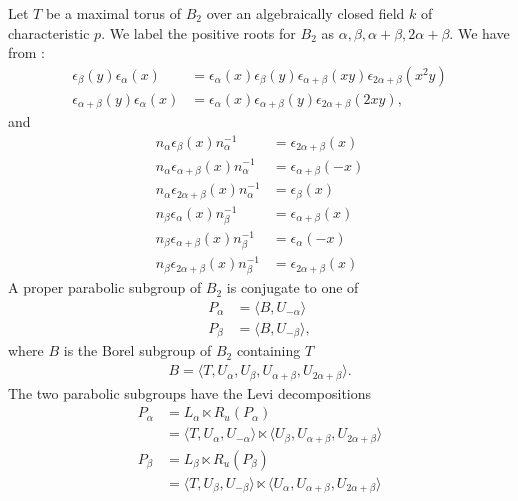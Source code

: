 Let $T$ be a maximal torus of $B_2$ over an algebraically closed field $k$ of characteristic $p$. We label the positive roots for $B_2$ as $\alpha, \beta, \alpha + \beta, 2\alpha + \beta$. We have from \cite[\S 33.4]{humphreys1975linear}:
\begin{align*}
\epsilon_\beta (y) \epsilon_\alpha (x) &= \epsilon_\alpha (x) \epsilon_\beta (y) \epsilon_{\alpha + \beta} (xy) \epsilon_{2\alpha+\beta} (x^2y) \\
\epsilon_{\alpha + \beta} (y) \epsilon_\alpha (x) &= \epsilon_\alpha (x) \epsilon_{\alpha + \beta} (y) \epsilon_{2\alpha + \beta} (2xy),
\end{align*}
and 
\begin{align*}
n_\alpha \epsilon_\beta(x) n_\alpha^{-1} &= \epsilon_{2\alpha+\beta}(x)\\
n_\alpha \epsilon_{\alpha+\beta}(x) n_\alpha^{-1} &= \epsilon_{\alpha+\beta}(-x)\\
n_\alpha \epsilon_{2\alpha+\beta}(x) n_\alpha^{-1} &= \epsilon_{\beta}(x)\\
n_\beta \epsilon_\alpha(x) n_\beta^{-1} &= \epsilon_{\alpha+\beta}(x)\\
n_\beta \epsilon_{\alpha+\beta}(x) n_\beta^{-1} &= \epsilon_{\alpha}(-x)\\
n_\beta \epsilon_{2\alpha+\beta}(x) n_\beta^{-1} &= \epsilon_{2\alpha+\beta}(x)
\end{align*}
A proper parabolic subgroup of $B_2$ is conjugate to one of
\begin{align*}
P_\alpha &= \langle B, U_{-\alpha} \rangle\\
P_\beta &= \langle B, U_{-\beta} \rangle,
\end{align*}
where $B$ is the Borel subgroup of $B_2$ containing $T$
\begin{align*}
B=\langle T, U_\alpha, U_\beta, U_{\alpha + \beta}, U_{2\alpha+\beta}\rangle.
\end{align*}
The two parabolic subgroups have the Levi decompositions
\begin{align*}
P_\alpha &= L_\alpha \ltimes R_u(P_\alpha) \\
&= \langle T, U_\alpha, U_{-\alpha} \rangle \ltimes \langle U_\beta, U_{\alpha + \beta}, U_{2\alpha + \beta} \rangle \\
P_\beta &= L_\beta \ltimes R_u(P_\beta) \\
&= \langle T, U_\beta, U_{-\beta} \rangle \ltimes \langle U_\alpha, U_{\alpha+\beta}, U_{2\alpha + \beta} \rangle
\end{align*}

